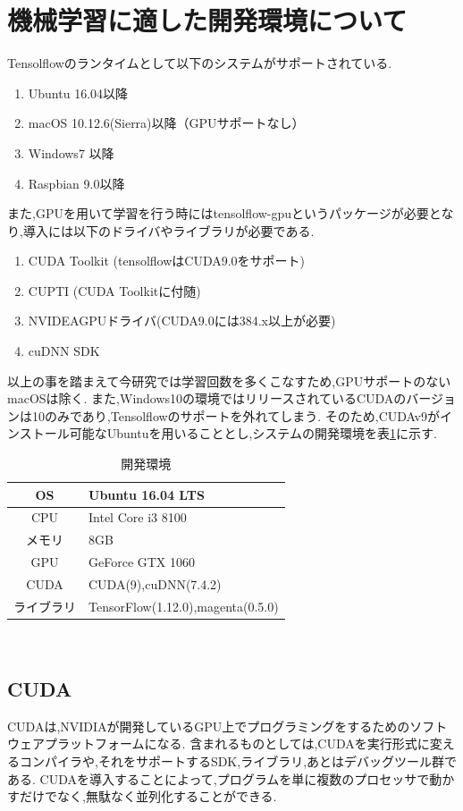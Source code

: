 \section{機械学習に適した開発環境について}
Tensolflowのランタイムとして以下のシステムがサポートされている.
\begin{enumerate}
    \renewcommand{\labelenumi}{(\arabic{enumi})}
    \item Ubuntu 16.04以降
    \item macOS 10.12.6(Sierra)以降（GPUサポートなし）
    \item Windows7 以降
    \item Raspbian 9.0以降
\end{enumerate}
また,GPUを用いて学習を行う時にはtensolflow-gpuというパッケージが必要となり,導入には以下のドライバやライブラリが必要である.
\begin{enumerate}
    \renewcommand{\labelenumi}{(\arabic{enumi})}
    \item CUDA Toolkit (tensolflowはCUDA9.0をサポート)
    \item CUPTI (CUDA Toolkitに付随)
    \item NVIDEAGPUドライバ(CUDA9.0には384.x以上が必要)
    \item cuDNN SDK
\end{enumerate}
以上の事を踏まえて今研究では学習回数を多くこなすため,GPUサポートのないmacOSは除く.
また,Windows10の環境ではリリースされているCUDAのバージョンは10のみであり,Tensolflowのサポートを外れてしまう.
そのため,CUDAv9がインストール可能なUbuntuを用いることとし,システムの開発環境を表\ref{tab:開発環境}に示す.
 \begin{table}[h]
    \begin{center}
    \caption{開発環境}
    \label{tab:開発環境}
    \begin{tabular}{|c|p{}|}
    \hline
        OS & Ubuntu 16.04 LTS\\
        \hline
        CPU & Intel Core i3 8100\\
        \hline
        メモリ & 8GB\\
        \hline
        GPU & GeForce GTX 1060\\
        \hline
        CUDA & CUDA(9),cuDNN(7.4.2)\\
        \hline
        ライブラリ & TensorFlow(1.12.0),magenta(0.5.0)\\
        \hline
    \end{tabular}
    \end{center}
\end{table}\\
\newpage
\subsection{CUDA}
CUDAは,NVIDIAが開発しているGPU上でプログラミングをするためのソフトウェアプラットフォームになる.
含まれるものとしては,CUDAを実行形式に変えるコンパイラや,それをサポートするSDK,ライブラリ,あとはデバッグツール群である.
CUDAを導入することによって,プログラムを単に複数のプロセッサで動かすだけでなく,無駄なく並列化することができる.